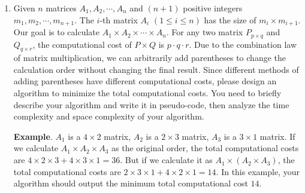 \documentclass[12pt,a4paper]{article}
\theoremstyle{definition}
\begin{document}
\begin{enumerate}
	\item Given $n$ matrices $A_1, A_2, \cdots, A_n$ and $(n+1)$ positive integers $m_1, m_2, \cdots, m_{n+1}$. The $i$-th matrix $A_i$ $(1 \leq i \leq n)$ has the size of $m_i \times m_{i+1}$. Our goal is to calculate $A_1\times A_2\times \cdots \times A_n$. For any two matrix $P_{p\times q}$ and $Q_{q\times r}$, the computational cost of $P\times Q$ is $p\cdot q\cdot r$. Due to the combination law of matrix multiplication, we can arbitrarily add parentheses to change the calculation order without changing the final result. Since different methods of adding parentheses have different computational costs, please design an algorithm to minimize the total computational costs. You need to briefly describe your algorithm and write it in pseudo-code, then analyze the time complexity and space complexity of your algorithm.
	
	\textbf{Example}. $A_1$ is a $4 \times 2$ matrix, $A_2$ is a $2\times 3$ matrix, $A_3$ is a $3 \times 1$ matrix. If we calculate $A_1\times A_2\times A_3$ as the original order, the total computational costs are $4\times 2\times 3 + 4\times 3\times 1 = 36$. But if we calculate it as $A_1 \times (A_2 \times A_3)$, the total computational costs are $2\times 3 \times 1 + 4 \times 2 \times 1 = 14$. In this example, your algorithm should output the minimum total computational cost $14$.


\end{enumerate}
\end{document}
